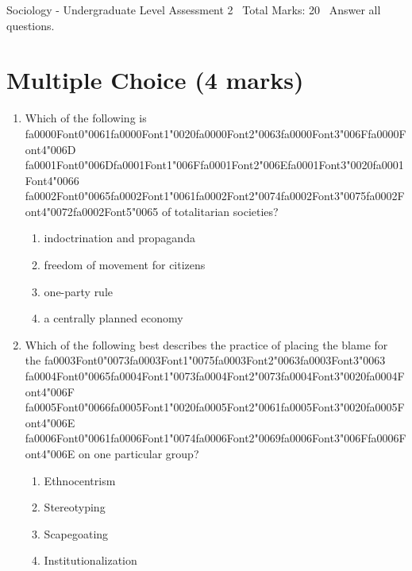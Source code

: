 \documentclass[12pt]{article}
\begin{document}
\begin{center}
Sociology - Undergraduate Level Assessment 2 \
Total Marks: 20 \
Answer all questions.
\end{center}

\section*{Multiple Choice (4 marks)}
\begin{enumerate}[label=\arabic*.]
\item Which of the following is {\csname fa0000Font0\endcsname\char"0061}{\csname fa0000Font1\endcsname\char"0020}{\csname fa0000Font2\endcsname\char"0063}{\csname fa0000Font3\endcsname\char"006F}{\csname fa0000Font4\endcsname\char"006D} {\csname fa0001Font0\endcsname\char"006D}{\csname fa0001Font1\endcsname\char"006F}{\csname fa0001Font2\endcsname\char"006E}{\csname fa0001Font3\endcsname\char"0020}{\csname fa0001Font4\endcsname\char"0066} {\csname fa0002Font0\endcsname\char"0065}{\csname fa0002Font1\endcsname\char"0061}{\csname fa0002Font2\endcsname\char"0074}{\csname fa0002Font3\endcsname\char"0075}{\csname fa0002Font4\endcsname\char"0072}{\csname fa0002Font5\endcsname\char"0065} of totalitarian societies?
\begin{enumerate}[label=(\alph*)]
    \item indoctrination and propaganda
    \item freedom of movement for citizens
    \item one-party rule
    \item a centrally planned economy
\end{enumerate}
\item Which of the following best describes the practice of placing the blame for the {\csname fa0003Font0\endcsname\char"0073}{\csname fa0003Font1\endcsname\char"0075}{\csname fa0003Font2\endcsname\char"0063}{\csname fa0003Font3\endcsname\char"0063} {\csname fa0004Font0\endcsname\char"0065}{\csname fa0004Font1\endcsname\char"0073}{\csname fa0004Font2\endcsname\char"0073}{\csname fa0004Font3\endcsname\char"0020}{\csname fa0004Font4\endcsname\char"006F} {\csname fa0005Font0\endcsname\char"0066}{\csname fa0005Font1\endcsname\char"0020}{\csname fa0005Font2\endcsname\char"0061}{\csname fa0005Font3\endcsname\char"0020}{\csname fa0005Font4\endcsname\char"006E} {\csname fa0006Font0\endcsname\char"0061}{\csname fa0006Font1\endcsname\char"0074}{\csname fa0006Font2\endcsname\char"0069}{\csname fa0006Font3\endcsname\char"006F}{\csname fa0006Font4\endcsname\char"006E} on one particular group?
\begin{enumerate}[label=(\alph*)]
    \item Ethnocentrism
    \item Stereotyping
    \item Scapegoating
    \item Institutionalization
\end{enumerate}
\end{enumerate}
\end{document}
